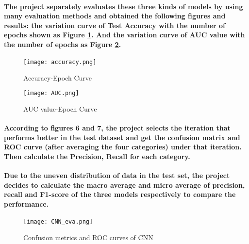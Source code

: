 \documentclass{article}
\begin{document}
\paragraph{The project separately evaluates these three kinds of models by using many evaluation methods and obtained the following figures and results: the variation curve of Test Accuracy with the number of epochs shown as Figure \ref{fig:Accuracy}. And the variation curve of AUC value with the number of epochs as Figure \ref{fig:AUC}.}

\begin{figure}
    \begin{centering}
    \texttt{[image: accuracy.png]}
    \par\end{centering}
    \caption{Accuracy-Epoch Curve}
    \label{fig:Accuracy}
\end{figure}

\begin{figure}
    \begin{centering}
    \texttt{[image: AUC.png]}
    \par\end{centering}
    \caption{AUC value-Epoch Curve}
    \label{fig:AUC}
\end{figure}

\paragraph{According to figures 6 and 7, the project selects the iteration that performs better in the test dataset and get the confusion matrix and ROC curve (after averaging the four categories) under that iteration. Then calculate the Precision, Recall for each category.}

\paragraph{Due to the uneven distribution of data in the test set, the project decides to calculate the macro average and micro average of precision, recall and F1-score of the three models respectively to compare the performance.}

\begin{figure}
    \begin{centering}
    \texttt{[image: CNN\_eva.png]}
    \par\end{centering}
    \caption{Confusion metrics and ROC curves of CNN}
    \label{fig:CNN_confusion_ROC}
\end{figure}
\end{document}
